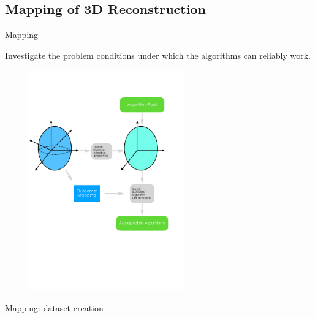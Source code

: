 \documentclass[10pt]{beamer}
\begin{document}
\subsection{Mapping of 3D Reconstruction}
\begin{frame}{Mapping}

Investigate the problem conditions under which the algorithms can reliably work.

\begin{figure}
\centering
\includegraphics[width=0.6\textwidth]{images/mapping_3d_vision.pdf}
\end{figure}


\end{frame}

\begin{frame}{Mapping: dataset creation}

\end{frame}
\end{document}
